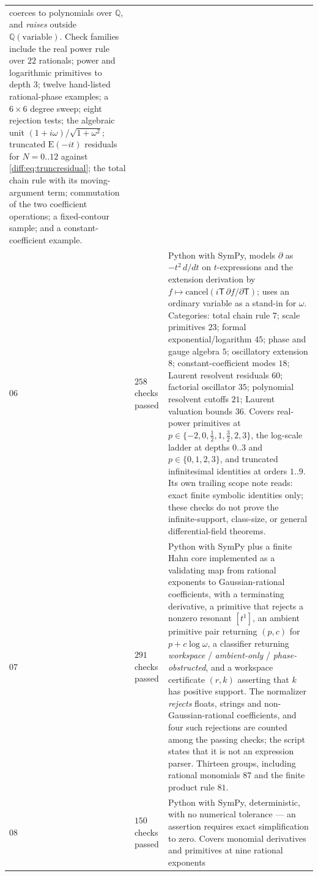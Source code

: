 \documentclass[11pt,letterpaper]{article}
\numberwithin{equation}{section}
\theoremstyle{definition}
\theoremstyle{remark}
\newcommand{\Q}{\mathbb Q}
\newcommand{\der}{\partial}
\newcommand{\Emm}{\mathrm{E}}
\begin{document}
\begin{longtable}{@{}L{0.09\textwidth}L{0.13\textwidth}L{0.70\textwidth}@{}}
coerces to polynomials over $\Q$, and \emph{raises} outside
$\Q(\text{variable})$. Check families include the real power rule over $22$
rationals; power and logarithmic primitives to depth $3$; twelve hand-listed
rational-phase examples; a $6\times6$ degree sweep; eight rejection tests;
the algebraic unit $(1+i\omega)/\sqrt{1+\omega^{2}}$; truncated
$\Emm(-it)$ residuals for $N=0..12$ against
\cref{diff:eq:truncresidual}; the total chain rule with its moving-argument
term; commutation of the two coefficient operations; a fixed-contour sample;
and a constant-coefficient example. \\[0.3em]
06 & $258$ checks passed &
Python with SymPy, models $\der$ as $-t^{2}\,d/dt$ on $t$-expressions and the
extension derivation by $f\mapsto\mathrm{cancel}(i\mathsf T\,\partial
f/\partial\mathsf T)$; uses an ordinary variable as a stand-in for $\omega$.
Categories: total chain rule $7$; scale primitives $23$; formal
exponential/logarithm $45$; phase and gauge algebra $5$; oscillatory
extension $8$; constant-coefficient modes $18$; Laurent resolvent residuals
$60$; factorial oscillator $35$; polynomial resolvent cutoffs $21$; Laurent
valuation bounds $36$. Covers real-power primitives at
$p\in\{-2,0,\tfrac12,1,\tfrac32,2,3\}$, the log-scale ladder at depths
$0..3$ and $p\in\{0,1,2,3\}$, and truncated infinitesimal identities at
orders $1..9$. Its own trailing scope note reads: exact finite symbolic
identities only; these checks do not prove the infinite-support, class-size,
or general differential-field theorems. \\[0.3em]
07 & $291$ checks passed &
Python with SymPy plus a finite Hahn core implemented as a validating map
from rational exponents to Gaussian-rational coefficients, with a terminating
derivative, a primitive that rejects a nonzero resonant $[t^{1}]$, an ambient
primitive pair returning $(p,c)$ for $p+c\log\omega$, a classifier returning
\emph{workspace} / \emph{ambient-only} / \emph{phase-obstructed}, and a
workspace certificate $(r,k)$ asserting that $k$ has positive support. The
normalizer \emph{rejects} floats, strings and non-Gaussian-rational
coefficients, and four such rejections are counted among the passing checks;
the script states that it is not an expression parser. Thirteen groups,
including rational monomials $87$ and the finite product rule $81$. \\[0.3em]
08 & $150$ checks passed &
Python with SymPy, deterministic, with no numerical tolerance --- an
assertion requires exact simplification to zero. Covers monomial derivatives
and primitives at nine rational exponents

\end{longtable}
\end{document}
